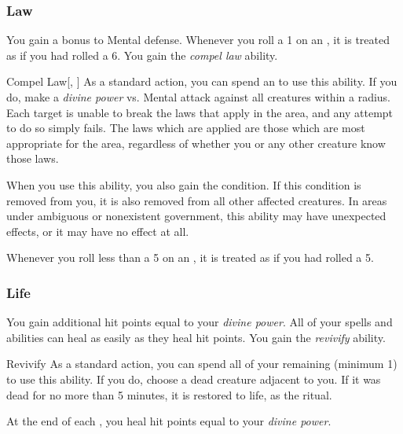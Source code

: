         \subsubsection{Law}
             You gain a  bonus to Mental defense.
             Whenever you roll a 1 on an , it is treated as if you had rolled a 6.
             You gain the \textit{compel law} ability.
            \begin{ability}{Compel Law}[, ]
                As a standard action, you can spend an  to use this ability.
                If you do, make a \textit{divine power} vs. Mental attack against all creatures within a \arealarge radius.
                \hit Each target is unable to break the laws that apply in the area, and any attempt to do so simply fails.
                The laws which are applied are those which are most appropriate for the area, regardless of whether you or any other creature know those laws.

                When you use this ability, you also gain the condition.
                If this condition is removed from you, it is also removed from all other affected creatures.
                In areas under ambiguous or nonexistent government, this ability may have unexpected effects, or it may have no effect at all.
            \end{ability}
             Whenever you roll less than a 5 on an , it is treated as if you had rolled a 5.

        \subsubsection{Life}
             You gain additional hit points equal to your \textit{divine power}.
             All of your  spells and abilities can heal  as easily as they heal hit points.
             You gain the \textit{revivify} ability.
            \begin{ability}{Revivify}
                As a standard action, you can spend all of your remaining  (minimum 1) to use this ability.
                If you do, choose a dead creature adjacent to you.
                If it was dead for no more than 5 minutes, it is restored to life, as the  ritual.
            \end{ability}
             At the end of each , you heal hit points equal to your \textit{divine power}.


